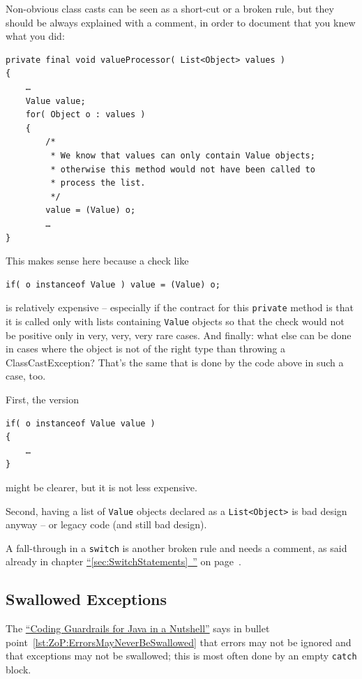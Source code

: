 \documentclass[11pt,a4paper, titlepage, parskip=half, headsepline, footsepline, cleardoublepage=current, headheight=1cm]{scrbook}
\newcommand*{\tqfullvref}[1]{\hyperref[{#1}]{“\ref*{#1}~\nameref*{#1}”} on page~\pageref{#1}}
\newcommand*{\ngref}{\hyperref[lst:NutshellGuardrails]{“Coding Guardrails for Java in a Nutshell”}}
\begin{document}
Non-obvious class casts can be seen as a short-cut or a broken rule, but they should be always explained with a comment, in order to document that you knew what you did:
\begin{lstlisting}
private final void valueProcessor( List<Object> values )
{
    …
    Value value;
    for( Object o : values )
    {
        /*
         * We know that values can only contain Value objects;
         * otherwise this method would not have been called to
         * process the list.
         */
        value = (Value) o;
        …
}
\end{lstlisting}
This makes sense here because a check like
\begin{lstlisting}
if( o instanceof Value ) value = (Value) o;
\end{lstlisting}
is relatively expensive – especially if the contract for this \lstinline|private| method is that it is called only with lists containing \lstinline|Value| objects so that the check would not be positive only in very, very, very rare cases. And finally: what else can be done in cases where the object is not of the right type than throwing a ClassCastException? That's the same that is done by the code above in such a case, too.

First, the version
\begin{lstlisting}
if( o instanceof Value value )
{
    …
}
\end{lstlisting}
might be clearer, but it is not less expensive.

Second, having a list of \lstinline|Value| objects declared as a \lstinline|List<Object>| is bad design anyway – or legacy code (and still bad design).

A fall-through in a \lstinline|switch| is another broken rule and needs a comment, as said already in chapter \tqfullvref{sec:SwitchStatements}.


\subsection{Swallowed Exceptions}
The \ngref{} says in bullet point~\ref{lst:ZoP:ErrorsMayNeverBeSwallowed} that errors may not be ignored and that exceptions may not be swallowed; this is most often done by an empty \lstinline|catch| block.
\end{document}
